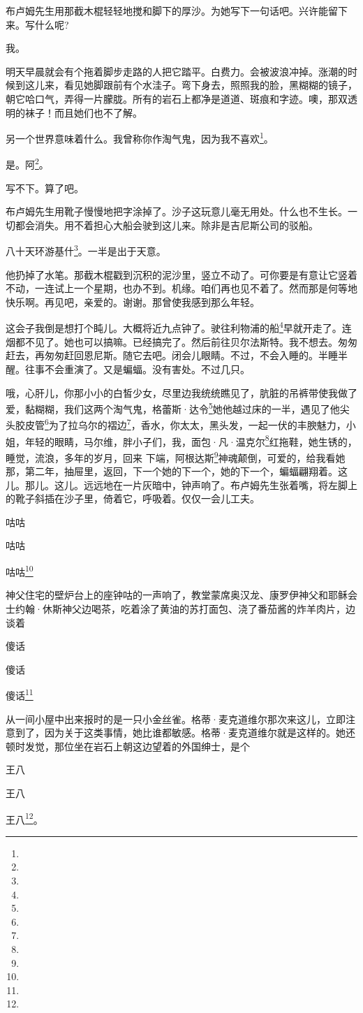\par 布卢姆先生用那截木棍轻轻地搅和脚下的厚沙。为她写下一句话吧。兴许能留下来。写什么呢?
\par 我。
\par 明天早晨就会有个拖着脚步走路的人把它踏平。白费力。会被波浪冲掉。涨潮的时候到这儿来，看见她脚跟前有个水洼子。弯下身去，照照我的脸，黑糊糊的镜子，朝它哈口气，弄得一片朦胧。所有的岩石上都净是道道、斑痕和字迹。噢，那双透明的袜子！而且她们也不了解。
\par 另一个世界意味着什么。我曾称你作淘气鬼，因为我不喜欢\footnote{}。
\par 是。阿\footnote{}。
\par 写不下。算了吧。
\par 布卢姆先生用靴子慢慢地把字涂掉了。沙子这玩意儿毫无用处。什么也不生长。一切都会消失。用不着担心大船会驶到这儿来。除非是吉尼斯公司的驳船。
\par 八十天环游基什\footnote{}。一半是出于天意。
\par 他扔掉了水笔。那截木棍戳到沉积的泥沙里，竖立不动了。可你要是有意让它竖着不动，一连试上一个星期，也办不到。机缘。咱们再也见不着了。然而那是何等地快乐啊。再见吧，亲爱的。谢谢。那曾使我感到那么年轻。
\par 这会子我倒是想打个盹儿。大概将近九点钟了。驶往利物浦的船\footnote{}早就开走了。连烟都不见了。她也可以搞嘛。已经搞完了。然后前往贝尔法斯特。我不想去。匆匆赶去，再匆匆赶回恩尼斯。随它去吧。闭会儿眼睛。不过，不会入睡的。半睡半醒。往事不会重演了。又是蝙蝠。没有害处。不过几只。
\par 哦，心肝儿，你那小小的白皙少女，尽里边我统统瞧见了，肮脏的吊裤带使我做了爱，黏糊糊，我们这两个淘气鬼，格蕾斯·达令\footnote{}她他越过床的一半，遇见了他尖头胶皮管\footnote{}为了拉乌尔的褶边\footnote{}，香水，你太太，黑头发，一起一伏的丰腴魅力，小姐，年轻的眼睛，马尔维，胖小子们，我，面包·凡·温克尔\footnote{}红拖鞋，她生锈的，睡觉，流浪，多年的岁月，回来 下端，阿根达斯\footnote{}神魂颠倒，可爱的，给我看她那，第二年，抽屉里，返回，下一个她的下一个，她的下一个，蝙蝠翩翔着。这儿。那儿。这儿。远远地在一片灰暗中，钟声响了。布卢姆先生张着嘴，将左脚上的靴子斜插在沙子里，倚着它，呼吸着。仅仅一会儿工夫。
\par 咕咕
\par 咕咕
\par 咕咕\footnote{}
\par 神父住宅的壁炉台上的座钟咕的一声响了，教堂蒙席奥汉龙、康罗伊神父和耶稣会士约翰·休斯神父边喝茶，吃着涂了黄油的苏打面包、浇了番茄酱的炸羊肉片，边谈着
\par 傻话
\par 傻话
\par 傻话\footnote{}
\par 从一间小屋中出来报时的是一只小金丝雀。格蒂·麦克道维尔那次来这儿，立即注意到了，因为关于这类事情，她比谁都敏感。格蒂·麦克道维尔就是这样的。她还顿时发觉，那位坐在岩石上朝这边望着的外国绅士，是个
\par 王八
\par 王八
\par 王八\footnote{}。




